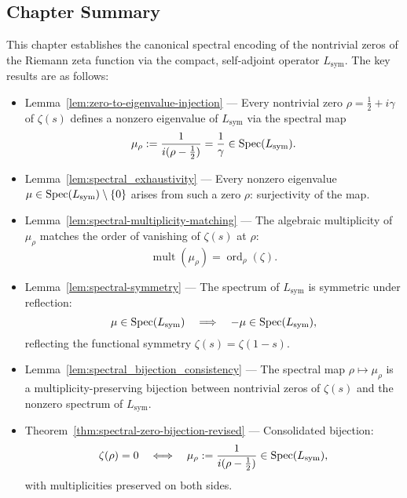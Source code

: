 \subsection*{Chapter Summary}

This chapter establishes the canonical spectral encoding of the nontrivial zeros of the Riemann zeta function via the compact, self-adjoint operator \( L_{\mathrm{sym}} \). The key results are as follows:

\begin{itemize}
  \item Lemma~\ref{lem:zero-to-eigenvalue-injection} — Every nontrivial zero \( \rho = \tfrac{1}{2} + i\gamma \) of \( \zeta(s) \) defines a nonzero eigenvalue of \( L_{\mathrm{sym}} \) via the spectral map
  \[
  \mu_\rho := \frac{1}{i(\rho - \tfrac{1}{2})} = \frac{1}{\gamma} \in \operatorname{Spec}(L_{\mathrm{sym}}).
  \]

  \item Lemma~\ref{lem:spectral_exhaustivity} — Every nonzero eigenvalue \( \mu \in \operatorname{Spec}(L_{\mathrm{sym}}) \setminus \{0\} \) arises from such a zero \( \rho \): surjectivity of the map.

  \item Lemma~\ref{lem:spectral-multiplicity-matching} — The algebraic multiplicity of \( \mu_\rho \) matches the order of vanishing of \( \zeta(s) \) at \( \rho \):
  \[
  \operatorname{mult}(\mu_\rho) = \operatorname{ord}_\rho(\zeta).
  \]

  \item Lemma~\ref{lem:spectral-symmetry} — The spectrum of \( L_{\mathrm{sym}} \) is symmetric under reflection:
  \[
  \mu \in \operatorname{Spec}(L_{\mathrm{sym}}) \quad \Longrightarrow \quad -\mu \in \operatorname{Spec}(L_{\mathrm{sym}}),
  \]
  reflecting the functional symmetry \( \zeta(s) = \zeta(1 - s) \).

  \item Lemma~\ref{lem:spectral_bijection_consistency} — The spectral map \( \rho \mapsto \mu_\rho \) is a multiplicity-preserving bijection between nontrivial zeros of \( \zeta(s) \) and the nonzero spectrum of \( L_{\mathrm{sym}} \).

  \item Theorem~\ref{thm:spectral-zero-bijection-revised} — Consolidated bijection:
  \[
  \zeta(\rho) = 0 \quad \Longleftrightarrow \quad \mu_\rho := \frac{1}{i(\rho - \tfrac{1}{2})} \in \operatorname{Spec}(L_{\mathrm{sym}}),
  \]
  with multiplicities preserved on both sides.
\end{itemize}

